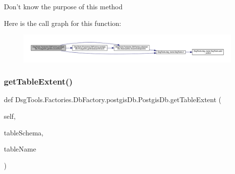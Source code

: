 \begin{DoxyVerb}Don't know the purpose of this method
\end{DoxyVerb}
 Here is the call graph for this function\+:
\nopagebreak
\begin{figure}[H]
\begin{center}
\leavevmode
\includegraphics[width=350pt]{class_dsg_tools_1_1_factories_1_1_db_factory_1_1postgis_db_1_1_postgis_db_a9539edb8eb6713fa788cb4d7c931778c_cgraph}
\end{center}
\end{figure}
\mbox{\label{class_dsg_tools_1_1_factories_1_1_db_factory_1_1postgis_db_1_1_postgis_db_a060cff436f63056b1f4ef9ce59caf5bd}} 
\subsubsection{\texorpdfstring{get\+Table\+Extent()}{getTableExtent()}}
{\footnotesize\ttfamily def Dsg\+Tools.\+Factories.\+Db\+Factory.\+postgis\+Db.\+Postgis\+Db.\+get\+Table\+Extent (\begin{DoxyParamCaption}\item[{}]{self,  }\item[{}]{table\+Schema,  }\item[{}]{table\+Name }\end{DoxyParamCaption})}


